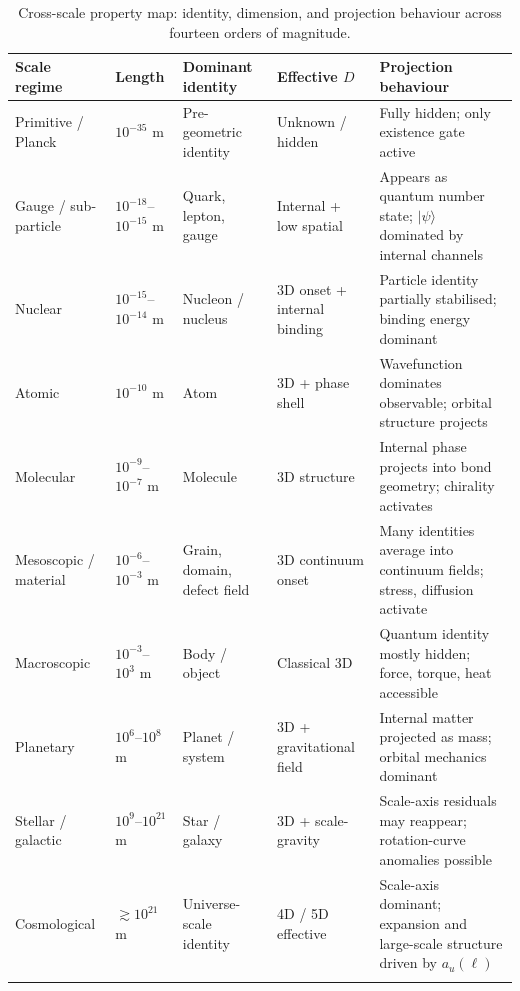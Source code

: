 \documentclass[11pt, a4paper, oneside]{article}
\theoremstyle{definition}
\theoremstyle{plain}
\theoremstyle{remark}
\begin{document}
\begin{longtable}{p{2.6cm} p{2.4cm} p{2.6cm} p{2.6cm} p{3.2cm}}
  \toprule
  \textbf{Scale regime} &
  \textbf{Length} &
  \textbf{Dominant identity} &
  \textbf{Effective $D$} &
  \textbf{Projection behaviour} \\
  \midrule
  \endhead
  Primitive / Planck &
  $10^{-35}$ m &
  Pre-geometric identity &
  Unknown / hidden &
  Fully hidden; only existence gate active \\[4pt]

  Gauge / sub-particle &
  $10^{-18}$--$10^{-15}$ m &
  Quark, lepton, gauge &
  Internal + low spatial &
  Appears as quantum number state; $|\psi\rangle$ dominated by internal channels \\[4pt]

  Nuclear &
  $10^{-15}$--$10^{-14}$ m &
  Nucleon / nucleus &
  3D onset + internal binding &
  Particle identity partially stabilised; binding energy dominant \\[4pt]

  Atomic &
  $10^{-10}$ m &
  Atom &
  3D + phase shell &
  Wavefunction dominates observable; orbital structure projects \\[4pt]

  Molecular &
  $10^{-9}$--$10^{-7}$ m &
  Molecule &
  3D structure &
  Internal phase projects into bond geometry; chirality activates \\[4pt]

  Meso\-scopic / material &
  $10^{-6}$--$10^{-3}$ m &
  Grain, domain, defect field &
  3D continuum onset &
  Many identities average into continuum fields; stress, diffusion activate \\[4pt]

  Macro\-scopic &
  $10^{-3}$--$10^{3}$ m &
  Body / object &
  Classical 3D &
  Quantum identity mostly hidden; force, torque, heat accessible \\[4pt]

  Planetary &
  $10^{6}$--$10^{8}$ m &
  Planet / system &
  3D + gravitational field &
  Internal matter projected as mass; orbital mechanics dominant \\[4pt]

  Stellar / galactic &
  $10^{9}$--$10^{21}$ m &
  Star / galaxy &
  3D + scale-gravity &
  Scale-axis residuals may reappear; rotation-curve anomalies possible \\[4pt]

  Cosmological &
  $\gtrsim 10^{21}$ m &
  Universe-scale identity &
  4D / 5D effective &
  Scale-axis dominant; expansion and large-scale structure driven by $a_u(\ell)$ \\
  \bottomrule
  \caption{Cross-scale property map: identity, dimension, and projection
    behaviour across fourteen orders of magnitude.}
  \label{tab:prop_map}
\end{longtable}
\end{document}
